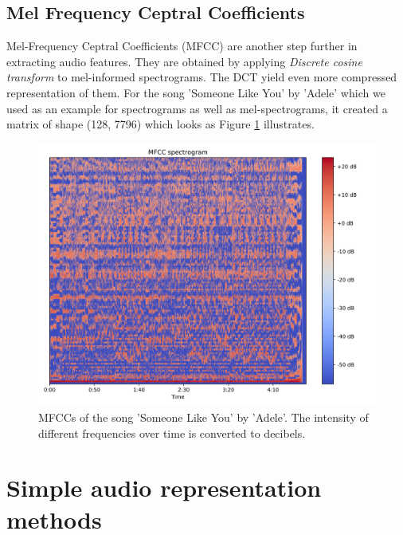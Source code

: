 \subsection{Mel Frequency Ceptral Coefficients}
Mel-Frequency Ceptral Coefficients (MFCC) are another step further in extracting audio features. They are obtained by applying \textit{Discrete cosine transform} to mel-informed spectrograms. The DCT yield even more compressed representation of them. For the song 'Someone Like You' by 'Adele' which we used as an example for spectrograms as well as mel-spectrograms, it created a matrix of shape (128, 7796) which looks as Figure \ref{fig:ilustrative_mfccs} illustrates.

\begin{figure}[h!]
    \centering
	\includegraphics[width=140mm]{./img/mfccs.png}
	\caption{MFCCs of the song 'Someone Like You' by 'Adele'. The intensity of different frequencies over time is converted to decibels.}
	\label{fig:ilustrative_mfccs}
\end{figure}

\section{Simple audio representation methods}\label{sec:audio_machine_learning}

